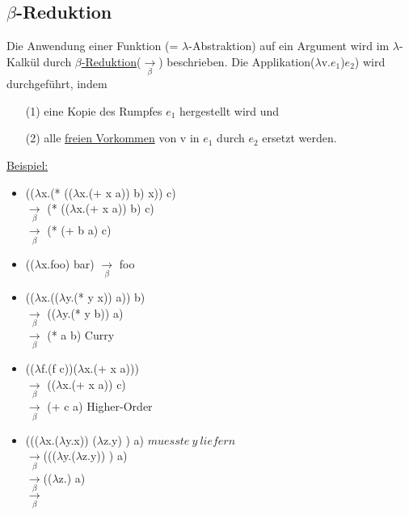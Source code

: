 \documentclass[a4paper,12pt]{article}
\begin{document}
\subsection{$\beta$-Reduktion}
Die Anwendung einer Funktion (= $\lambda$-Abstraktion) auf ein Argument wird im $\lambda$-Kalkül durch \uline{$\beta$-Reduktion}($\underset{\beta}{\rightarrow}$) beschrieben. Die Applikation($\lambda$v.$e_1$)$e_2$) wird durchgeführt, indem
\begin{itemize}
\item[(1)] eine Kopie des Rumpfes $e_1$ hergestellt wird und
\item[(2)] alle \uline{freien Vorkommen} von v in $e_1$ durch $e_2$ ersetzt werden.
\end{itemize} 
\uline{Beispiel:}
\begin{itemize}
\item 
(($\lambda$x.(* (($\lambda$x.(+ x a)) b) x)) c)\\
$\underset{\beta}{\rightarrow}$ (* (($\lambda$x.(+ x a)) b) c)\\
$\underset{\beta}{\rightarrow}$ (* (+ b a) c)
\item
(($\lambda$x.foo) bar) $\underset{\beta}{\rightarrow}$ foo
\item 
(($\lambda$x.(($\lambda$y.(* y x)) a)) b)\\
$\underset{\beta}{\rightarrow}$ (($\lambda$y.(* y b)) a)\\
$\underset{\beta}{\rightarrow}$ (* a b) Curry
\item
(($\lambda$f.(f c))($\lambda$x.(+ x a)))\\
$\underset{\beta}{\rightarrow}$ (($\lambda$x.(+ x a)) c)\\
$\underset{\beta}{\rightarrow}$ (+ c a) Higher-Order
\item
((($\lambda$x.($\lambda$y.x)) ($\lambda$z.y) \maltese) a) $muesste\ y\ liefern$\\
$\underset{\beta}{\rightarrow}$((($\lambda$y.($\lambda$z.y)) \maltese) a)\\
$\underset{\beta}{\rightarrow}$(($\lambda$z.\maltese) a)\\
$\underset{\beta}{\rightarrow}$\maltese
\end{itemize}
\end{document}
